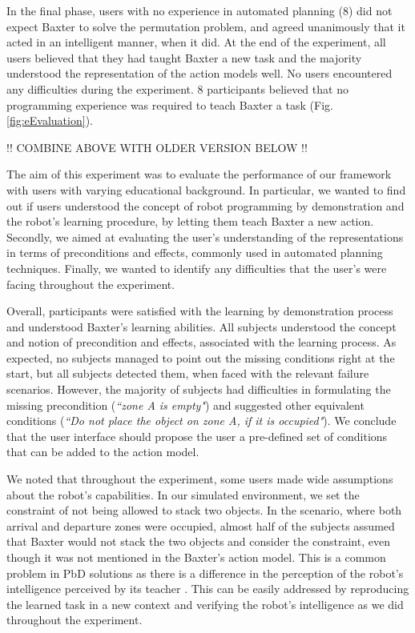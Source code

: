 In the final phase, users with no experience in automated planning (8) did not expect Baxter to solve the permutation problem, and agreed unanimously that it acted in an intelligent manner, when it did. At the end of the experiment, all users believed that they had taught Baxter a new task and the majority understood the representation of the action models well. No users encountered any difficulties during the experiment. 8 participants believed that no programming experience was required to teach Baxter a task (Fig. \ref{fig:eEvaluation}).

!! COMBINE ABOVE WITH OLDER VERSION BELOW !!

The aim of this experiment was to evaluate the performance of our framework with users with varying educational background. In particular, we wanted to find out if users understood the concept of robot programming by demonstration and the robot's learning procedure, by letting them teach Baxter a new action. Secondly, we aimed at evaluating the user's understanding of the representations in terms of preconditions and effects, commonly used in automated planning techniques. Finally, we wanted to identify any difficulties that the user's were facing throughout the experiment.

Overall, participants were satisfied with the learning by demonstration process and understood Baxter's learning abilities. All subjects understood the concept and notion of precondition and effects, associated with the learning process. As expected, no subjects managed to point out the missing conditions right at the start, but all subjects detected them, when faced with the relevant failure scenarios. However, the majority of subjects had difficulties in formulating the missing precondition (\textit{``zone A is empty"}) and suggested other equivalent conditions (\textit{``Do not place the object on zone A, if it is occupied"}). We conclude that the user interface should propose the user a pre-defined set of conditions that can be added to the action model.

We noted that throughout the experiment, some users made wide assumptions about the robot's capabilities. In our simulated environment, we set the constraint of not being allowed to stack two objects. In the scenario, where both arrival and departure zones were occupied, almost half of the subjects assumed that Baxter would not stack the two objects and consider the constraint, even though it was not mentioned in the Baxter's action model.
This is a common problem in PbD solutions as there is a difference in the perception of the robot's intelligence perceived by its teacher \cite{suay2012practical}. This can be easily addressed by reproducing the learned task in a new context and verifying the robot's intelligence as we did throughout the experiment.

